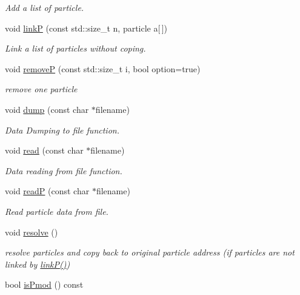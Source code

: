 \begin{DoxyCompactItemize}
\begin{DoxyCompactList}\small\item\em Add a list of particle. \end{DoxyCompactList}\item 
void \hyperlink{classARC_1_1chain_ac9771f362ea8f985973f27973c0ee31f}{linkP} (const std\+::size\+\_\+t n, particle a\mbox{[}$\,$\mbox{]})
\begin{DoxyCompactList}\small\item\em Link a list of particles without coping. \end{DoxyCompactList}\item 
void \hyperlink{classARC_1_1chain_ab19c57af30f8eebd5dfac3de2cab2ade}{removeP} (const std\+::size\+\_\+t i, bool option=true)
\begin{DoxyCompactList}\small\item\em remove one particle \end{DoxyCompactList}\item 
void \hyperlink{classARC_1_1chain_a6caef2b2dc81cc944377a3ea511c0fe8}{dump} (const char $\ast$filename)
\begin{DoxyCompactList}\small\item\em Data Dumping to file function. \end{DoxyCompactList}\item 
void \hyperlink{classARC_1_1chain_a3f328bce3650bab9496987bc5a1f5a98}{read} (const char $\ast$filename)
\begin{DoxyCompactList}\small\item\em Data reading from file function. \end{DoxyCompactList}\item 
void \hyperlink{classARC_1_1chain_a5325cc6945e9992b431450f7846e91e5}{readP} (const char $\ast$filename)
\begin{DoxyCompactList}\small\item\em Read particle data from file. \end{DoxyCompactList}\item 
void \hyperlink{classARC_1_1chain_a4f6a1518c7c788a9ef3d12dd8e5aec7a}{resolve} ()
\begin{DoxyCompactList}\small\item\em resolve particles and copy back to original particle address (if particles are not linked by \hyperlink{classARC_1_1chain_ac9771f362ea8f985973f27973c0ee31f}{link\+P()}) \end{DoxyCompactList}\item 
bool \hyperlink{classARC_1_1chain_a22fd005339b734ba2973ba47bf5ddc62}{is\+Pmod} () const

\end{DoxyCompactItemize}
